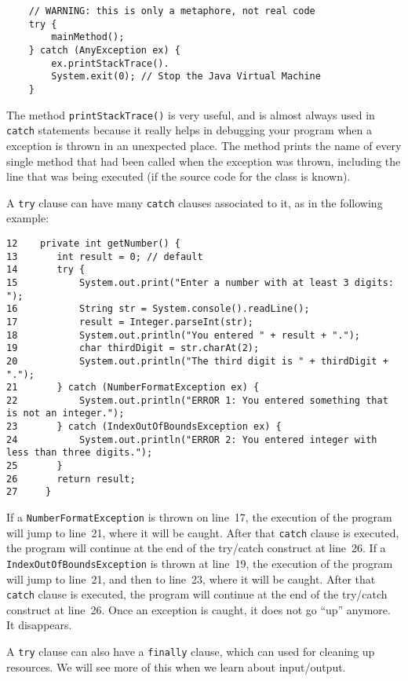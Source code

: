 \begin{verbatim}
    // WARNING: this is only a metaphore, not real code
    try {
        mainMethod();
    } catch (AnyException ex) {
        ex.printStackTrace().
        System.exit(0); // Stop the Java Virtual Machine
    }
\end{verbatim}

The method \verb+printStackTrace()+ is very useful, and is almost
always used in \verb+catch+ statements because it really helps in
debugging your program when a exception is thrown in an unexpected
place. The method prints the name of every single method that had been
called when the exception was thrown, including the line that was
being executed (if the source code for the class is known). 

A \verb+try+ clause can have many \verb+catch+ clauses associated to
it, as in the following example: 

\begin{verbatim}
12    private int getNumber() {
13       int result = 0; // default
14       try {
15           System.out.print("Enter a number with at least 3 digits: ");
16           String str = System.console().readLine();
17           result = Integer.parseInt(str);
18           System.out.println("You entered " + result + ".");
19           char thirdDigit = str.charAt(2);
20           System.out.println("The third digit is " + thirdDigit + ".");
21       } catch (NumberFormatException ex) {
22           System.out.println("ERROR 1: You entered something that is not an integer.");
23       } catch (IndexOutOfBoundsException ex) {
24           System.out.println("ERROR 2: You entered integer with less than three digits.");
25       }
26       return result;
27     }
\end{verbatim}

If a \verb+NumberFormatException+ is thrown on line~17, the execution
of the program will jump to line~21, where it will be caught. After
that \verb+catch+ clause is executed, the program will continue at the
end of the try/catch construct at line~26. If a
\verb+IndexOutOfBoundsException+ is thrown at line~19, the execution
of the program will jump to line~21, and then to line~23, where it
will be caught. After that \verb+catch+ clause is executed, the
program will continue at the end of the try/catch construct at
line~26.  
Once an exception is caught, it does not go ``up'' anymore. It
disappears. 


A \verb+try+ clause can also have a \verb+finally+ clause, which can
used for cleaning up resources. We will see more of this when we learn
about input/output. 

